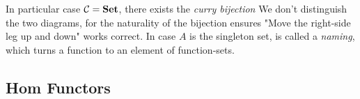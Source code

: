 In particular case $\mathcal{C} = \boldsymbol{\mathrm{Set}}$, there exists the \emph{curry bijection}
We don't distinguish the two diagrams, for %
the naturality of the bijection ensures "Move the right-side leg up and down" works correct.
\mynewline
In case $A$ is the singleton set,
is called a \emph{naming}, which turns a function to an element of function-sets.


\subsection{Hom Functors}

